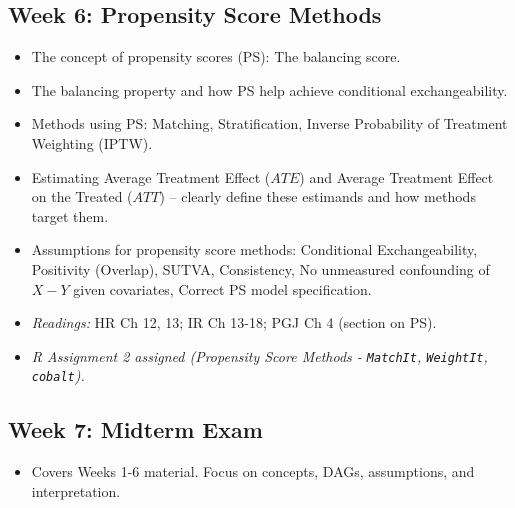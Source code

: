 \documentclass[10.5pt]{article}
\begin{document}
\subsection*{Week 6: Propensity Score Methods}
\begin{itemize}
    \item The concept of propensity scores (PS): The balancing score.
    \item The balancing property and how PS help achieve conditional exchangeability.
    \item Methods using PS: Matching, Stratification, Inverse Probability of Treatment Weighting (IPTW).
    \item Estimating Average Treatment Effect ($ATE$) and Average Treatment Effect on the Treated ($ATT$) – clearly define these estimands and how methods target them.
    \item Assumptions for propensity score methods: Conditional Exchangeability, Positivity (Overlap), SUTVA, Consistency, No unmeasured confounding of $X-Y$ given covariates, Correct PS model specification.
    \item \textit{Readings:} HR Ch 12, 13; IR Ch 13-18; PGJ Ch 4 (section on PS).
    \item \textit{R Assignment 2 assigned (Propensity Score Methods - \texttt{MatchIt}, \texttt{WeightIt}, \texttt{cobalt}).}
\end{itemize}

\subsection*{Week 7: Midterm Exam}
\begin{itemize}
    \item Covers Weeks 1-6 material. Focus on concepts, DAGs, assumptions, and interpretation.
\end{itemize}
\end{document}

